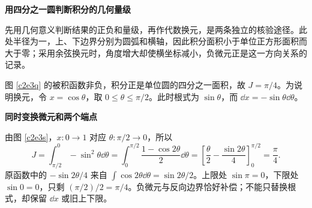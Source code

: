 \begin{solution}\textbf{用四分之一圆判断积分的几何量级}\par\nobreak
先用几何意义判断结果的正负和量级，再作代数换元，是两条独立的核验途径。此处半径为一，上、下边界分别为圆弧和横轴，因此积分面积小于单位正方形面积而大于零；采用余弦换元时，角度增大却使横坐标减小，负微元正是这一方向关系的记录。

图 \ref{c2e3q} 的被积函数非负，积分正是单位圆的四分之一面积，故 $J=\pi/4$。为说明换元，令 $x=\cos\theta$，取 $0\le\theta\le\pi/2$。此时根式为 $\sin\theta$，而 $\dd x=-\sin\theta\dd\theta$。



\par\medskip{}\noindent\textbf{同时变换微元和两个端点}\par\nobreak
由图 \ref{c2e3s}，$x:0\to1$ 对应 $\theta:\pi/2\to0$，所以
\[
 J=\int_{\pi/2}^{0}-\sin^2\theta\dd\theta
 =\int_0^{\pi/2}\frac{1-\cos2\theta}2\dd\theta
 =\left[\frac\theta2-\frac{\sin2\theta}4\right]_0^{\pi/2}
 =\boxed{\frac\pi4}.
\]
原函数中的 $-\sin2\theta/4$ 来自 $\int\cos2\theta\dd\theta=\sin2\theta/2$。上限处 $\sin\pi=0$，下限处 $\sin0=0$，只剩 $(\pi/2)/2=\pi/4$。负微元与反向边界恰好补偿；不能只替换根式，却保留 $\dd x$ 或旧上下限。
\end{solution}

